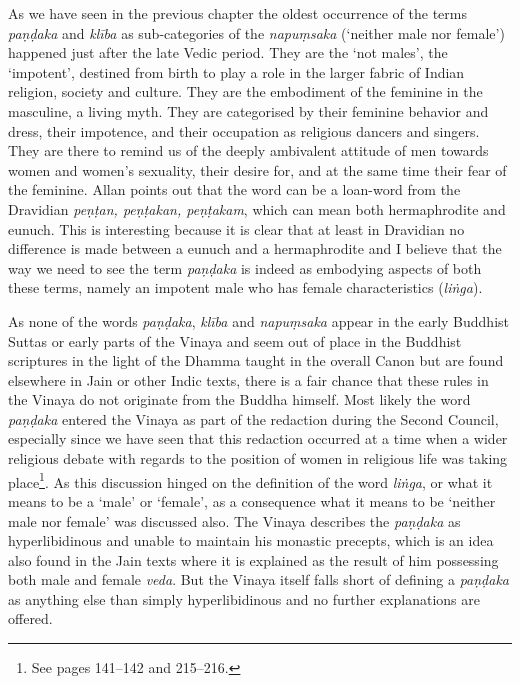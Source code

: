 As we have seen in the previous chapter the oldest occurrence of the terms {\em paṇḍaka} and {\em klība} as sub-categories of the {\em napuṃsaka} (`neither male nor female') happened just after the late Vedic period. They are the `not males', the `impotent', destined from birth to play a role in the larger fabric of Indian religion, society and culture. They are the embodiment of the feminine in the masculine, a living myth. They are categorised by their feminine behavior and dress, their impotence, and their occupation as religious dancers and singers. They are there to remind us of the deeply ambivalent attitude of men towards women and women's sexuality, their desire for, and at the same time their fear of the feminine. Allan \cite{bomhard} points out that the word can be a loan-word from the Dravidian {\em peṇṭan, peṇṭakan, peṇṭakam}, which can mean both hermaphrodite and eunuch. This is interesting because it is clear that at least in Dravidian no difference is made between a eunuch and a hermaphrodite and I believe that the way we need to see the term {\em paṇḍaka} is indeed as embodying aspects of both these terms, namely an impotent male who has female characteristics ({\em liṅga}).

As none of the words {\em paṇḍaka}, {\em klība} and {\em napuṃsaka} appear in the early Buddhist Suttas or early parts of the Vinaya and seem out of place in the Buddhist scriptures in the light of the Dhamma taught in the overall Canon but are found elsewhere in Jain or other Indic texts, there is a fair chance that these rules in the Vinaya do not originate from the Buddha himself. Most likely the word {\em paṇḍaka} entered the Vinaya as part of the redaction during the Second Council, especially since we have seen that this redaction occurred at a time when a wider religious debate with regards to the position of women in religious life was taking place\footnote{See \cite{sujato2009} pages 141–142 and 215–216.}. As this discussion hinged on the definition of the word {\em liṅga}, or what it means to be a `male' or `female', as a consequence what it means to be `neither male nor female' was discussed also. The Vinaya describes the {\em paṇḍaka} as hyperlibidinous and unable to maintain his monastic precepts, which is an idea also found in the Jain texts where it is explained as the result of him possessing both male and female {\em veda}. But the Vinaya itself falls short of defining a {\em paṇḍaka} as anything else than simply hyperlibidinous and no further explanations are offered. 

